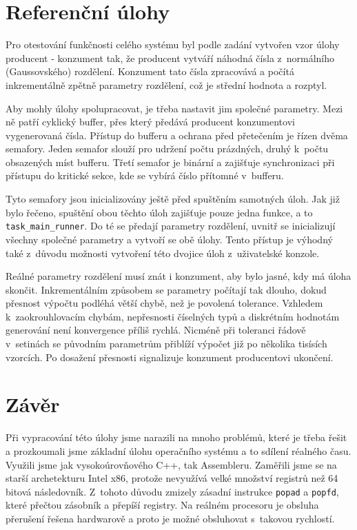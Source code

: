 \documentclass[a4paper,12pt]{article}
\begin{document}
\section{Referenční úlohy}
Pro otestování funkčnosti celého systému byl podle zadání vytvořen vzor úlohy producent - konzument tak, že producent vytváří
náhodná čísla z~normálního (Gaussovského) rozdělení. Konzument tato čísla zpracovává a počítá inkrementálně zpětně parametry rozdělení, což je střední hodnota a rozptyl.

Aby mohly úlohy spolupracovat, je třeba nastavit jim společné parametry. Mezi ně patří cyklický buffer, přes který
předává producent konzumentovi vygenerovaná čísla. Přístup do bufferu a ochrana před přetečením je řízen dvěma semafory.
Jeden semafor slouží pro udržení počtu prázdných, druhý k~počtu obsazených míst bufferu. Třetí semafor je binární a zajišťuje synchronizaci při přístupu do kritické sekce, kde se vybírá číslo přítomné v~bufferu.

Tyto semafory jsou inicializovány ještě před spuštěním samotných úloh. Jak již bylo řečeno, spuštění obou těchto úloh
zajišťuje pouze jedna funkce, a to \verb+task_main_runner+. Do té se předají parametry rozdělení, uvnitř se inicializují všechny společné parametry a vytvoří se obě úlohy. Tento přístup je výhodný také z~důvodu možnosti vytvoření této dvojice úloh z~uživatelské konzole.

Reálné parametry rozdělení musí znát i konzument, aby bylo jasné, kdy má úloha skončit. Inkrementálním způsobem se parametry počítají tak dlouho, dokud přesnost výpočtu podléhá větší chybě, než je povolená tolerance. Vzhledem k~zaokrouhlovacím chybám, nepřesnosti číselných typů a diskrétním hodnotám generování není konvergence příliš rychlá. Nicméně při toleranci řádově v~setinách se původním parametrům přiblíží výpočet již po několika tisísích vzorcích. Po dosažení přesnosti signalizuje konzument producentovi ukončení.


\section{Závěr}
Při vypracování této úlohy jsme narazili na mnoho problémů, které je třeba
řešit a prozkoumali jsme základní úlohu operačního systému a to sdílení réalného času.
Využili jsme jak vysokoúrovňového C++, tak Assembleru. Zaměřili jsme se na starší
archetekturu Intel x86, protože nevyužívá velké množství registrů než 64 bitová
následovník. Z~tohoto důvodu zmizely zásadní instrukce \texttt{popad} a \texttt{popfd},
které přečtou zásobník a přepíší registry. Na reálném procesoru je obsluha přerušení řešena
hardwarově a proto je možné obsluhovat s~takovou rychlostí.
\end{document}
